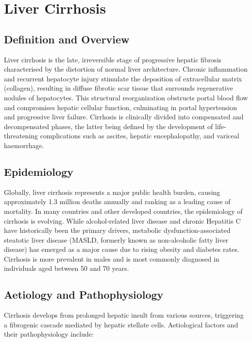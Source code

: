 \chapter{Liver Cirrhosis}

\section*{Definition and Overview}
Liver cirrhosis is the late, irreversible stage of progressive hepatic fibrosis characterised by the distortion of normal liver architecture. Chronic inflammation and recurrent hepatocyte injury stimulate the deposition of extracellular matrix (collagen), resulting in diffuse fibrotic scar tissue that surrounds regenerative nodules of hepatocytes. This structural reorganization obstructs portal blood flow and compromises hepatic cellular function, culminating in portal hypertension and progressive liver failure. Cirrhosis is clinically divided into compensated and decompensated phases, the latter being defined by the development of life-threatening complications such as ascites, hepatic encephalopathy, and variceal haemorrhage.

\section*{Epidemiology}
Globally, liver cirrhosis represents a major public health burden, causing approximately 1.3 million deaths annually and ranking as a leading cause of mortality. In many countries and other developed countries, the epidemiology of cirrhosis is evolving. While alcohol-related liver disease and chronic Hepatitis C have historically been the primary drivers, metabolic dysfunction-associated steatotic liver disease (MASLD, formerly known as non-alcoholic fatty liver disease) has emerged as a major cause due to rising obesity and diabetes rates. Cirrhosis is more prevalent in males and is most commonly diagnosed in individuals aged between 50 and 70 years.

\section*{Aetiology and Pathophysiology}
Cirrhosis develops from prolonged hepatic insult from various sources, triggering a fibrogenic cascade mediated by hepatic stellate cells. Aetiological factors and their pathophysiology include:


